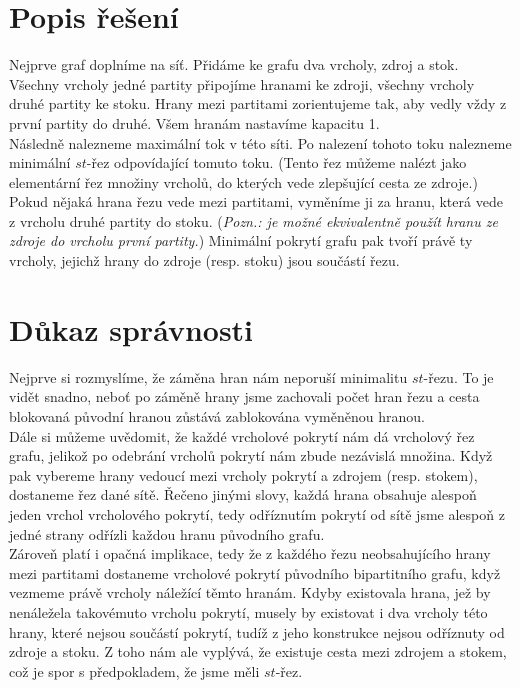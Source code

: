 \documentclass{scrartcl}
\begin{document}
\section{Popis řešení}
Nejprve graf doplníme na síť. Přidáme ke grafu dva vrcholy, zdroj a stok. Všechny vrcholy jedné partity připojíme hranami ke zdroji, všechny vrcholy druhé partity ke stoku. Hrany mezi partitami zorientujeme tak, aby vedly vždy z první partity do druhé. Všem hranám nastavíme kapacitu 1. \\

Následně nalezneme maximální tok v této síti. Po nalezení tohoto toku nalezneme minimální $st$-řez odpovídající tomuto toku. (Tento řez můžeme nalézt jako elementární řez množiny vrcholů, do kterých vede zlepšující cesta ze zdroje.) \\

Pokud nějaká hrana řezu vede mezi partitami, vyměníme ji za hranu, která vede z vrcholu druhé partity do stoku. (\textit{Pozn.: je možné ekvivalentně použít hranu ze zdroje do vrcholu první partity.}) Minimální pokrytí grafu pak tvoří právě ty vrcholy, jejichž hrany do zdroje (resp. stoku) jsou součástí řezu.

\section{Důkaz správnosti}
Nejprve si rozmyslíme, že záměna hran nám neporuší minimalitu $st$-řezu. To je vidět snadno, neboť po záměně hrany jsme zachovali počet hran řezu a cesta blokovaná původní hranou zůstává zablokována vyměněnou hranou. \\

Dále si můžeme uvědomit, že každé vrcholové pokrytí nám dá vrcholový řez grafu, jelikož po odebrání vrcholů pokrytí nám zbude nezávislá množina. Když pak vybereme hrany vedoucí mezi vrcholy pokrytí a zdrojem (resp. stokem), dostaneme řez dané sítě. Řečeno jinými slovy, každá hrana obsahuje alespoň jeden vrchol vrcholového pokrytí, tedy odříznutím pokrytí od sítě jsme alespoň z jedné strany odřízli každou hranu původního grafu. \\

Zároveň platí i opačná implikace, tedy že z každého řezu neobsahujícího hrany mezi partitami dostaneme vrcholové pokrytí původního bipartitního grafu, když vezmeme právě vrcholy náležící těmto hranám. Kdyby existovala hrana, jež by nenáležela takovémuto vrcholu pokrytí, musely by existovat i dva vrcholy této hrany, které nejsou součástí pokrytí, tudíž z jeho konstrukce nejsou odříznuty od zdroje a stoku. Z toho nám ale vyplývá, že existuje cesta mezi zdrojem a stokem, což je spor s předpokladem, že jsme měli $st$-řez. \\
\end{document}
